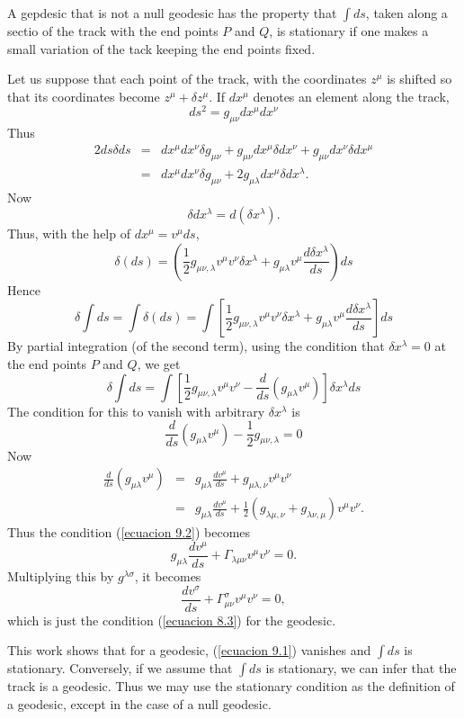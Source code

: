 A gepdesic that is not a null geodesic has the property that $\int ds$, taken 
along a sectio of the track with the end points $P$ and $Q$, is stationary if 
one makes a small variation of the tack keeping the end points fixed.

Let us suppose that each point of the track, with the coordinates $z^\mu$ is 
shifted so that its coordinates become $z^\mu + \delta z^\mu$. If $dx^\mu$ 
denotes an element along the track,
\[
 ds^2 = g_{ \mu \nu } dx^\mu dx^\nu
\]
Thus
\[
\begin{array}{rcl}
 2 ds \delta ds & = & d x ^\mu dx^\nu \delta g_{\mu\nu} 
    + g_{\mu\nu} dx^\mu \delta dx^\nu
    + g_{\mu\nu} dx^\nu \delta dx^\mu  \\
    & = & d x ^\mu dx^\nu \delta g_{\mu\nu}  
    + 2 g_{\mu\lambda}dx^\mu \delta dx^\lambda .
\end{array}
\]
Now
\[
\delta dx^\lambda = d (\delta x^\lambda).
\]
Thus, with the help of $dx^\mu = v^\mu ds$,
\[
    \delta(ds) = \left(
    \frac{1}{2} g_{\mu\nu,\lambda}v^\mu v^\nu \delta x^\lambda  
    + g_{\mu\lambda}v^\mu \frac{d\delta x^\lambda}{ds}
    \right) ds
\]
Hence
\[
\delta \int ds = \int{\delta (ds)}
 = \int \left[
    \frac{1}{2} g_{\mu\nu,\lambda}v^\mu v^\nu \delta x^\lambda  
    + g_{\mu\lambda}v^\mu \frac{d\delta x^\lambda}{ds}
    \right] ds
\]
By partial integration (of the second term), using the condition that $\delta 
x^\lambda = 0$ at the end points $P$ and $Q$, we get
\begin{equation}
 \label{ecuacion 9.1}
 \delta \int ds 
 = \int \left[
    \frac{1}{2} g_{\mu\nu,\lambda}v^\mu v^\nu 
    -   \frac{d}{ds} \left(g_{\mu\lambda}v^\mu\right)
    \right] \delta x^\lambda   ds
\end{equation}
The condition for this to vanish with arbitrary $\delta x^\lambda$ is
\begin{equation}
 \label{ecuacion 9.2}
 \frac{d}{ds}\left(g_{\mu\lambda} v^\mu\right) 
 - \frac{1}{2}g_{\mu\nu,\lambda} = 0
\end{equation}
Now
\[
\begin{array}{rcl}
 \frac{d}{ds}\left(g_{\mu\lambda} v^\mu\right) & = &  
  g_{\mu\lambda}\frac{dv^\mu}{ds} + g_{\mu\lambda,\nu}v^\mu v^\nu \\
  & = & g_{\mu\lambda}\frac{dv^\mu}{ds} + 
  \frac{1}{2}\left( g_{\lambda\mu,\nu} + g_{\lambda\nu,\mu} \right) v^\mu v^\nu 
.
\end{array}
\]
Thus the condition (\ref{ecuacion 9.2}) becomes
\[
 g_{\mu\lambda}\frac{dv^\mu}{ds} + \Gamma_{\lambda\mu\nu}v^\mu v^\nu = 0.
\]
Multiplying this by $g^{\lambda\sigma}$, it becomes
\[
 \frac{dv^\sigma}{ds} + \Gamma^\sigma_{\mu\nu}v^\mu v^\nu = 0,
\]
which is just the condition (\ref{ecuacion 8.3}) for the geodesic.

This work shows that for a geodesic, (\ref{ecuacion 9.1}) vanishes and $\int 
ds$ is stationary. Conversely, if we assume that $\int ds$ is stationary, we 
can infer that the track is a geodesic. Thus we may use the stationary 
condition as the definition of a geodesic, except in the case of a null 
geodesic.

